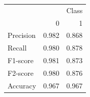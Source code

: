 \begin{tabular}{lrr}
\toprule
 & \multicolumn{2}{r}{Class} \\
 & 0 & 1 \\
\midrule
Precision & 0.982 & 0.868 \\
Recall & 0.980 & 0.878 \\
F1-score & 0.981 & 0.873 \\
F2-score & 0.980 & 0.876 \\
Accuracy & 0.967 & 0.967 \\
\bottomrule
\end{tabular}
